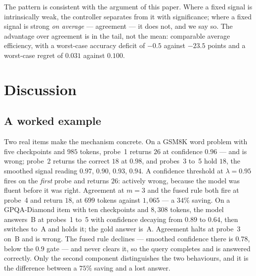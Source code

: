 \documentclass[acmsmall]{acmart}
\theoremstyle{acmdefinition}%
\theoremstyle{acmplain}}{}%
\begin{document}
The pattern is consistent with the argument of this paper. Where a fixed signal is intrinsically weak, the controller separates from it with significance; where a fixed signal is strong \emph{on average} --- agreement --- it does not, and we say so. The advantage over agreement is in the tail, not the mean: comparable average efficiency, with a worst-case accuracy deficit of $-0.5$ against $-23.5$ points and a worst-case regret of $0.031$ against $0.100$.

\section{Discussion}\label{sec:discussion}

\subsection{A worked example}
Two real items make the mechanism concrete. On a GSM8K word problem with five checkpoints and $985$ tokens, probe~1 returns $26$ at confidence $0.96$ --- and is wrong; probe~2 returns the correct $18$ at $0.98$, and probes~3 to~5 hold $18$, the smoothed signal reading $0.97$, $0.90$, $0.93$, $0.94$. A confidence threshold at $\lambda=0.95$ fires on the \emph{first} probe and returns $26$: actively wrong, because the model was fluent before it was right. Agreement at $m=3$ and the fused rule both fire at probe~4 and return $18$, at $699$ tokens against $1{,}065$ --- a $34\%$ saving. On a GPQA-Diamond item with ten checkpoints and $8{,}308$ tokens, the model answers~B at probes~1 to~5 with confidence decaying from $0.89$ to $0.64$, then switches to~A and holds it; the gold answer is~A. Agreement halts at probe~3 on~B and is wrong. The fused rule declines --- smoothed confidence there is $0.78$, below the $0.9$ gate --- and never clears it, so the query completes and is answered correctly. Only the second component distinguishes the two behaviours, and it is the difference between a $75\%$ saving and a lost answer.
\end{document}
